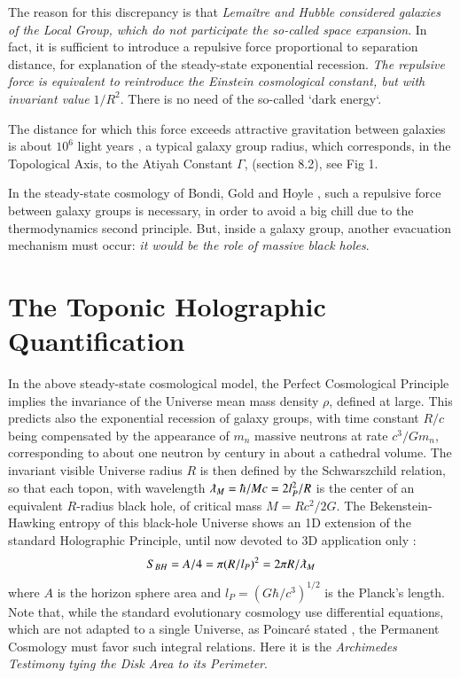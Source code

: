 \documentclass[twoside,draft]{article}
\begin{document}
\begin{sloppypar}
The reason for this discrepancy is that \textit{Lema\^itre and Hubble considered galaxies of the Local Group, which do not participate the so-called space expansion}. In fact, it is sufficient to introduce a repulsive force proportional to separation distance, for explanation of the steady-state exponential recession. \textit{The repulsive force is equivalent to reintroduce  the Einstein cosmological constant, but with invariant value} $1/R^{2}$. There is no need of the so-called `dark energy`.

The distance for which this force exceeds attractive gravitation between galaxies is about $10^{6}$ light years \cite{Sanchez1}, a typical galaxy group radius, which corresponds, in the Topological Axis, to the Atiyah Constant $\Gamma$, (section 8.2), see Fig 1.

In the steady-state cosmology of Bondi, Gold and Hoyle \cite{Sanchez1}, such a repulsive force between galaxy groups is necessary, in order to avoid a big chill due to the thermodynamics second principle. But, inside a galaxy group, another evacuation mechanism must occur: \textit{it would be the role of massive black holes}.

\section{The Toponic Holographic Quantification}

In the above steady-state cosmological model, the Perfect Cosmological Principle implies the invariance of the Universe mean mass density $\rho$, defined at large. This predicts also the exponential recession of galaxy groups, with time constant $R/c$ being compensated by the appearance of $m_n$ massive neutrons at rate $c^{3} /Gm_{n}$, 
corresponding to about one neutron by century in about a cathedral volume. 
The invariant visible Universe radius $R$ is then defined by the Schwarszchild relation, so that each topon, with wavelength $\lambdabar_M = \hbar/Mc = 2l_{P}^{2} /R$ is the center of an equivalent $R$-radius black hole, of critical mass $M = Rc^{2} /2G$. The Bekenstein-Hawking entropy of this black-hole Universe shows an 1D extension \cite{Sanchez1} of the standard Holographic Principle, until now devoted to 3D application only \cite{Bousso}:
\begin{equation}
S_{BH} = A/4 = \pi(R/l_{P})^{2} = 2\pi R/\lambdabar_{M}
\end{equation}
where $A$ is the horizon sphere area and $l_{P} = (G\hbar/c^{3} )^{1/2}$ is the Planck's length. Note that, while the standard evolutionary cosmology use differential equations, which are not adapted to a single Universe, as Poincar\'{e} stated \cite{Sanchez1}, the Permanent Cosmology must favor such integral relations. Here it is the \textit{Archimedes Testimony tying the Disk Area to its Perimeter}.


\end{sloppypar}
\end{document}
